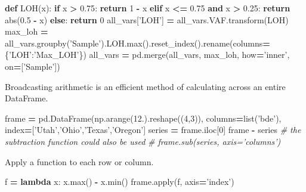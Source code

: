 \documentclass[]{book}
\newenvironment{Shaded}{\begin{snugshade}}{\end{snugshade}}
\newcommand{\BuiltInTok}[1]{#1}
\newcommand{\CommentTok}[1]{\textcolor[rgb]{0.56,0.35,0.01}{\textit{#1}}}
\newcommand{\ControlFlowTok}[1]{\textcolor[rgb]{0.13,0.29,0.53}{\textbf{#1}}}
\newcommand{\DecValTok}[1]{\textcolor[rgb]{0.00,0.00,0.81}{#1}}
\newcommand{\FloatTok}[1]{\textcolor[rgb]{0.00,0.00,0.81}{#1}}
\newcommand{\KeywordTok}[1]{\textcolor[rgb]{0.13,0.29,0.53}{\textbf{#1}}}
\newcommand{\NormalTok}[1]{#1}
\newcommand{\OperatorTok}[1]{\textcolor[rgb]{0.81,0.36,0.00}{\textbf{#1}}}
\newcommand{\StringTok}[1]{\textcolor[rgb]{0.31,0.60,0.02}{#1}}
\begin{document}
\begin{Shaded}
\begin{Highlighting}[]
\KeywordTok{def}\NormalTok{ LOH(x):}
    \ControlFlowTok{if}\NormalTok{ x }\OperatorTok{>} \FloatTok{0.75}\NormalTok{: }\ControlFlowTok{return} \DecValTok{1} \OperatorTok{-}\NormalTok{ x}
    \ControlFlowTok{elif}\NormalTok{ x }\OperatorTok{<=} \FloatTok{0.75} \KeywordTok{and}\NormalTok{ x }\OperatorTok{>} \FloatTok{0.25}\NormalTok{: }\ControlFlowTok{return} \BuiltInTok{abs}\NormalTok{(}\FloatTok{0.5} \OperatorTok{-}\NormalTok{ x)}
    \ControlFlowTok{else}\NormalTok{: }\ControlFlowTok{return} \DecValTok{0}
\NormalTok{all_vars[}\StringTok{'LOH'}\NormalTok{] }\OperatorTok{=}\NormalTok{ all_vars.VAF.transform(LOH)}
\NormalTok{max_loh }\OperatorTok{=}\NormalTok{ all_vars.groupby(}\StringTok{'Sample'}\NormalTok{).LOH.}\BuiltInTok{max}\NormalTok{().reset_index().rename(columns}\OperatorTok{=}\NormalTok{\{}\StringTok{'LOH'}\NormalTok{:}\StringTok{'Max_LOH'}\NormalTok{\})}
\NormalTok{all_vars }\OperatorTok{=}\NormalTok{ pd.merge(all_vars, max_loh, how}\OperatorTok{=}\StringTok{'inner'}\NormalTok{, on}\OperatorTok{=}\NormalTok{[}\StringTok{'Sample'}\NormalTok{])}
\end{Highlighting}
\end{Shaded}

Broadcasting arithmetic is an efficient method of calculating across an entire DataFrame.

\begin{Shaded}
\begin{Highlighting}[]
\NormalTok{frame }\OperatorTok{=}\NormalTok{ pd.DataFrame(np.arange(}\FloatTok{12.}\NormalTok{).reshape((}\DecValTok{4}\NormalTok{,}\DecValTok{3}\NormalTok{)), columns}\OperatorTok{=}\BuiltInTok{list}\NormalTok{(}\StringTok{'bde'}\NormalTok{), index}\OperatorTok{=}\NormalTok{[}\StringTok{'Utah'}\NormalTok{,}\StringTok{'Ohio'}\NormalTok{,}\StringTok{'Texas'}\NormalTok{,}\StringTok{'Oregon'}\NormalTok{]}
\NormalTok{series }\OperatorTok{=}\NormalTok{ frame.iloc[}\DecValTok{0}\NormalTok{]}
\NormalTok{frame }\OperatorTok{-}\NormalTok{ series}
\CommentTok{# the subtraction function could also be used}
\CommentTok{# frame.sub(series, axis='columns')}
\end{Highlighting}
\end{Shaded}

Apply a function to each row or column.

\begin{Shaded}
\begin{Highlighting}[]
\NormalTok{f }\OperatorTok{=} \KeywordTok{lambda}\NormalTok{ x: x.}\BuiltInTok{max}\NormalTok{() }\OperatorTok{-}\NormalTok{ x.}\BuiltInTok{min}\NormalTok{()}
\NormalTok{frame.}\BuiltInTok{apply}\NormalTok{(f, axis}\OperatorTok{=}\StringTok{'index'}\NormalTok{)}
\end{Highlighting}
\end{Shaded}
\end{document}
